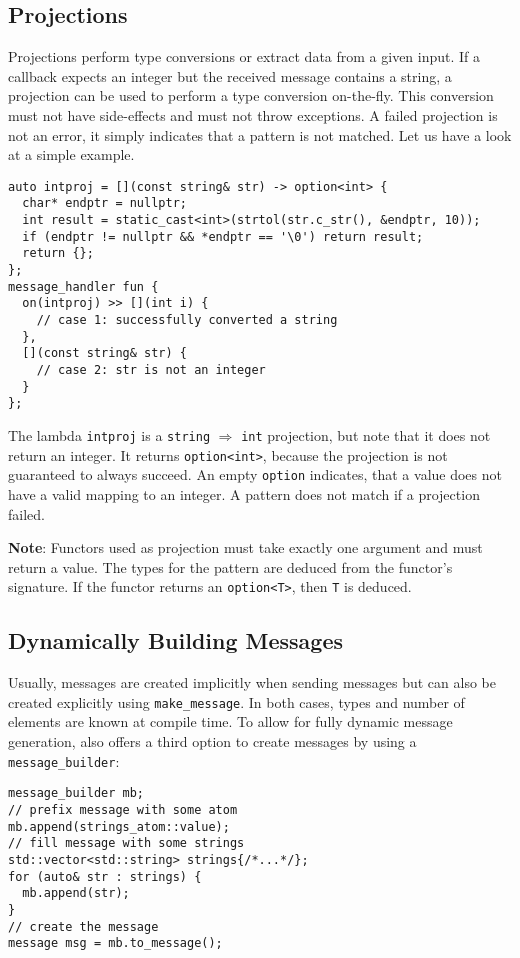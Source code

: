 \subsection{Projections}

Projections perform type conversions or extract data from a given input.
If a callback expects an integer but the received message contains a string, a projection can be used to perform a type conversion on-the-fly.
This conversion must not have side-effects and must not throw exceptions.
A failed projection is not an error, it simply indicates that a pattern is not matched.
Let us have a look at a simple example.

\begin{lstlisting}
auto intproj = [](const string& str) -> option<int> {
  char* endptr = nullptr;
  int result = static_cast<int>(strtol(str.c_str(), &endptr, 10));
  if (endptr != nullptr && *endptr == '\0') return result;
  return {};
};
message_handler fun {
  on(intproj) >> [](int i) {
    // case 1: successfully converted a string
  },
  [](const string& str) {
    // case 2: str is not an integer
  }
};
\end{lstlisting}

The lambda \lstinline^intproj^ is a \lstinline^string^ $\Rightarrow$ \lstinline^int^ projection, but note that it does not return an integer.
It returns \lstinline^option<int>^, because the projection is not guaranteed to always succeed.
An empty \lstinline^option^ indicates, that a value does not have a valid mapping to an integer.
A pattern does not match if a projection failed.

\textbf{Note}: Functors used as projection must take exactly one argument and must return a value.
The types for the pattern are deduced from the functor's signature.
If the functor returns an \lstinline^option<T>^, then \lstinline^T^ is deduced.

\subsection{Dynamically Building Messages}

Usually, messages are created implicitly when sending messages but can also be created explicitly using \lstinline^make_message^.
In both cases, types and number of elements are known at compile time.
To allow for fully dynamic message generation, \lib also offers a third option to create messages by using a \lstinline^message_builder^:

\begin{lstlisting}
message_builder mb;
// prefix message with some atom
mb.append(strings_atom::value);
// fill message with some strings
std::vector<std::string> strings{/*...*/};
for (auto& str : strings) {
  mb.append(str);
}
// create the message
message msg = mb.to_message();
\end{lstlisting}
